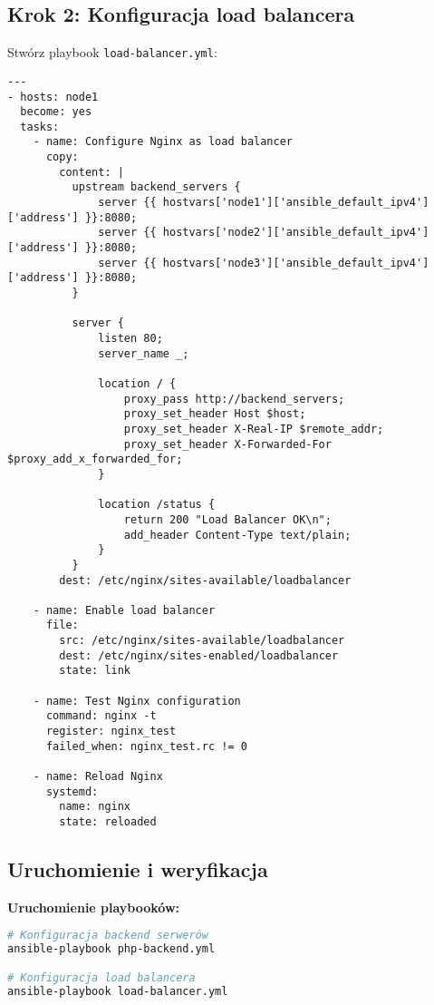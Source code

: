 \documentclass{article}
\begin{document}
\subsection*{Krok 2: Konfiguracja load balancera}

Stwórz playbook \texttt{load-balancer.yml}:

\begin{lstlisting}
---
- hosts: node1
  become: yes
  tasks:
    - name: Configure Nginx as load balancer
      copy:
        content: |
          upstream backend_servers {
              server {{ hostvars['node1']['ansible_default_ipv4']['address'] }}:8080;
              server {{ hostvars['node2']['ansible_default_ipv4']['address'] }}:8080;  
              server {{ hostvars['node3']['ansible_default_ipv4']['address'] }}:8080;
          }
          
          server {
              listen 80;
              server_name _;
              
              location / {
                  proxy_pass http://backend_servers;
                  proxy_set_header Host $host;
                  proxy_set_header X-Real-IP $remote_addr;
                  proxy_set_header X-Forwarded-For $proxy_add_x_forwarded_for;
              }
              
              location /status {
                  return 200 "Load Balancer OK\n";
                  add_header Content-Type text/plain;
              }
          }
        dest: /etc/nginx/sites-available/loadbalancer
        
    - name: Enable load balancer
      file:
        src: /etc/nginx/sites-available/loadbalancer  
        dest: /etc/nginx/sites-enabled/loadbalancer
        state: link
        
    - name: Test Nginx configuration
      command: nginx -t
      register: nginx_test
      failed_when: nginx_test.rc != 0
      
    - name: Reload Nginx
      systemd:
        name: nginx
        state: reloaded
\end{lstlisting}

\subsection*{Uruchomienie i weryfikacja}

\textbf{Uruchomienie playbooków:}
\begin{lstlisting}[language=bash]
# Konfiguracja backend serwerów
ansible-playbook php-backend.yml

# Konfiguracja load balancera  
ansible-playbook load-balancer.yml
\end{lstlisting}
\end{document}
